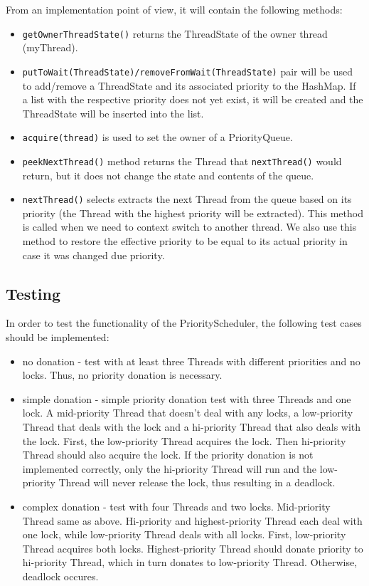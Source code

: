 \documentclass[a4paper,10pt]{article}
\begin{document}
From an implementation point of view, it will contain the following methods:
\begin{itemize}
\item \texttt{getOwnerThreadState()} returns the ThreadState of the owner thread (myThread).
\item \texttt{putToWait(ThreadState)/removeFromWait(ThreadState)} pair will be used to add/remove a ThreadState and its associated priority to the HashMap. If a list with the respective priority does not yet exist, it will be created and the ThreadState will be inserted into the list. 
\item \texttt{acquire(thread)} is used to set the owner of a PriorityQueue.
\item \texttt{peekNextThread()} method returns the Thread that \texttt{nextThread()} would return, but it does not change the state and contents of the queue.
\item \texttt{nextThread()} selects extracts the next Thread from the queue based on its priority (the Thread with the highest priority will be extracted). This method is called when we need to context switch to another thread. We also use this method to restore the effective priority to be equal to its actual priority in case it was changed due priority.
\end{itemize}

\subsection{Testing}

In order to test the functionality of the PriorityScheduler, the following test cases should be implemented:
\begin{itemize}
\item no donation - test with at least three Threads with different priorities and no locks. Thus, no priority donation is necessary.
\item simple donation - simple priority donation test with three Threads and one lock. A mid-priority Thread that doesn't deal with any locks, a low-priority Thread that deals with the lock and a hi-priority Thread that also deals with the lock. First, the low-priority Thread acquires the lock. Then hi-priority Thread should also acquire the lock. If the priority donation is not implemented correctly, only the hi-priority Thread will run and the low-priority Thread will never release the lock, thus resulting in a deadlock.
\item complex donation - test with four Threads and two locks. Mid-priority Thread same as above. Hi-priority and highest-priority Thread each deal with one lock, while low-priority Thread deals with all locks. First, low-priority Thread acquires both locks. Highest-priority Thread should donate priority to hi-priority Thread, which in turn donates to low-priority Thread. Otherwise, deadlock occures.
\end{itemize}
\end{document}
